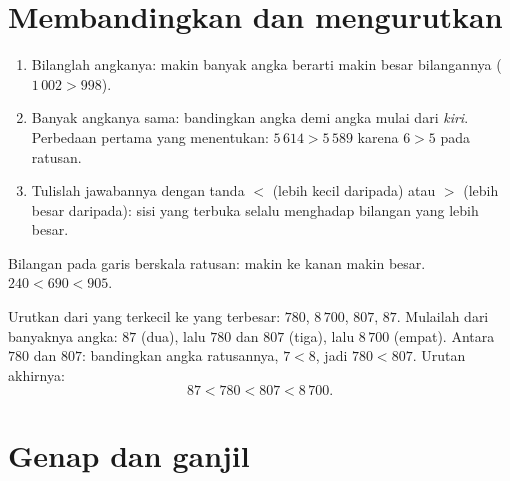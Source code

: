 \section{Membandingkan dan mengurutkan}

\begin{method}\label{met:g3:numbers:compare}
\begin{enumerate}
  \item Bilanglah angkanya: makin banyak angka berarti makin besar
        bilangannya ($1\,002 > 998$).
  \item Banyak angkanya sama: bandingkan angka demi angka mulai dari
        \emph{kiri}. Perbedaan pertama yang menentukan:
        $5\,614 > 5\,589$ karena $6 > 5$ pada ratusan.
  \item Tulislah jawabannya dengan tanda $<$ (lebih kecil daripada)
        atau $>$ (lebih besar daripada): sisi yang terbuka selalu
        menghadap bilangan yang lebih besar.
\end{enumerate}
\end{method}

\begin{omfigure}

{\small Bilangan pada garis berskala ratusan: makin ke kanan makin
besar. $240 < 690 < 905$.}
\end{omfigure}

\begin{example}\label{ex:g3:numbers:order}
Urutkan dari yang terkecil ke yang terbesar: $780$, $8\,700$, $807$,
$87$. Mulailah dari banyaknya angka: $87$ (dua), lalu $780$ dan
$807$ (tiga), lalu $8\,700$ (empat). Antara $780$ dan $807$:
bandingkan angka ratusannya, $7 < 8$, jadi $780 < 807$. Urutan
akhirnya:
\[
87 < 780 < 807 < 8\,700 .
\]
\end{example}

\section{Genap dan ganjil}

